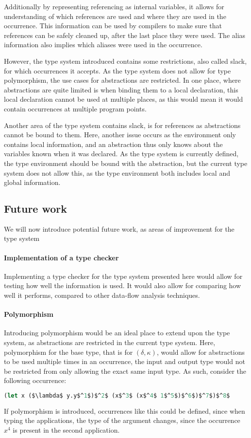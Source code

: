 \documentclass[../../master.tex]{subfiles}
\begin{document}
Additionally by representing referencing as internal variables, it allows for understanding of which references are used and where they are used in the occurrence.
This information can be used by compilers to make sure that references can be safely cleaned up, after the last place they were used.
The alias information also implies which aliases were used in the occurrence.
\bigskip

However, the type system introduced contains some restrictions, also called slack, for which occurrences it accepts.
As the type system does not allow for type polymorphism, the use cases for abstractions are restricted.
In one place, where abstractions are quite limited is when binding them to a local declaration, this local declaration cannot be used at multiple places, as this would mean it would contain occurrences at multiple program points.

Another area of the type system contains slack, is for references as abstractions cannot be bound to them.
Here, another issue occurs as the environment only contains local information, and an abstraction thus only knows about the variables known when it was declared.
As the type system is currently defined, the type environment should be bound with the abstraction, but the current type system does not allow this, as the type environment both includes local and global information.


\subsection{Future work}\label{sec:FW}
We will now introduce potential future work, as areas of improvement for the type system

\paragraph{Implementation of a type checker}
Implementing a type checker for the type system presented here would allow for testing how well the information is used.
It would also allow for comparing how well it performs, compared to other data-flow analysis techniques.

\paragraph{Polymorphism}
Introducing polymorphism would be an ideal place to extend upon the type system, as abstractions are restricted in the current type system.
Here, polymorphism for the base type, that is for $(\delta,\kappa)$, would allow for abstractions to be used multiple times in an occurrence, the input and output type would not be restricted from only allowing the exact same input type.
As such, consider the following occurrence:
\begin{lstlisting}[language=Caml, mathescape=true]
(let x ($\lambda$ y.y$^1$)$^2$ (x$^3$ (x$^4$ 1$^5$)$^6$)$^7$)$^8$
\end{lstlisting}
If polymorphism is introduced, occurrences like this could be defined, since when typing the applications, the type of the argument changes, since the occurrence $x^4$ is present in the second application.
\end{document}
